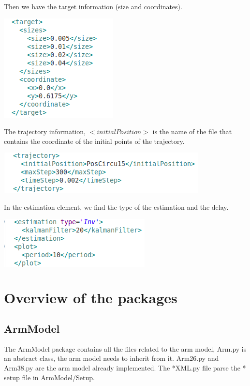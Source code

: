 \documentclass[a4paper]{article}
\begin{document}
Then we have the target information (size and coordinates).
\begin{flushleft}
\includegraphics[scale=0.5]{XMLTarget.png}
\end{flushleft}
The trajectory information, $<initialPosition>$ is the name of the file that contains the coordinate of the initial points of the trajectory.
\begin{flushleft}
\includegraphics[scale=0.5]{XMLTraj.png}
\end{flushleft}
In the estimation element, we find the type of the estimation and the delay.  
\begin{flushleft}
\includegraphics[scale=0.5]{XMLEstim.png}
\end{flushleft}

\section{Overview of the packages}

\subsection{ArmModel}
The ArmModel package contains all the files related to the arm model, 
Arm.py is an abstract class, the arm model needs to inherit from it. 
Arm26.py and Arm38.py are the arm model already implemented. The *XML.py file parse the * setup file in ArmModel/Setup.
\end{document}
